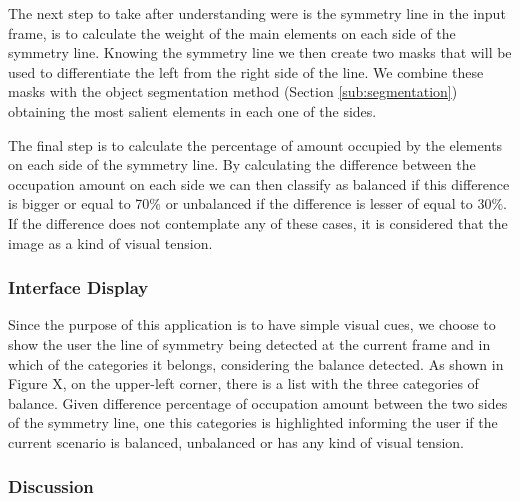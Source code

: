 \begin{description}
	The next step to take after understanding were is the symmetry line in the input frame, is to calculate the weight of the main elements on each side of the symmetry line. Knowing the symmetry line we then create two masks that will be used to differentiate the left from the right side of the line. We combine these masks with the object segmentation method (Section \ref{sub:segmentation}) obtaining the most salient elements in each one of the sides. 
	
	The final step is to calculate the percentage of amount occupied by the elements on each side of the symmetry line. By calculating the difference between the occupation amount on each side we can then classify as balanced if this difference is bigger or equal to 70\% or unbalanced if the difference is lesser of equal to 30\%. If the difference does not contemplate any of these cases, it is considered that the image as a kind of visual tension.
	
\end{description}

\subsubsection{Interface Display}

Since the purpose of this application is to have simple visual cues, we choose to show the user the line of symmetry being detected at the current frame and in which of the categories it belongs, considering the balance detected. As shown in Figure X, on the upper-left corner, there is a list with the three categories of balance. Given difference percentage of occupation amount between the two sides of the symmetry line, one this categories is highlighted informing the user if the current scenario is balanced, unbalanced or has any kind of visual tension.


\subsubsection{Discussion}

